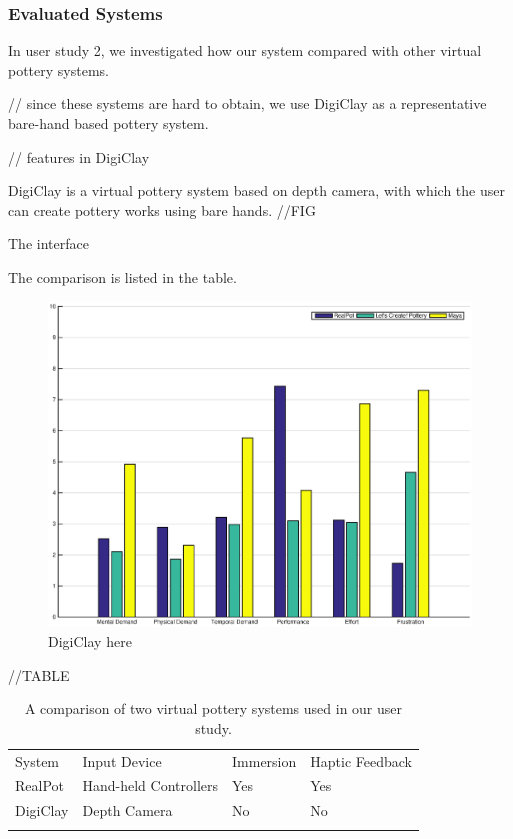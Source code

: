 \subsubsection{Evaluated Systems}

In user study 2, we investigated how our system compared with other virtual pottery systems.

// since these systems are hard to obtain, we use DigiClay as a representative bare-hand based pottery system.

// features in DigiClay

DigiClay is a virtual pottery system based on depth camera, with which the user can create pottery works using bare hands. //FIG

The interface 

The comparison is listed in the table.


\begin{figure}
	\includegraphics[width=\textwidth]{fig14.eps}
	\caption{DigiClay here}
	\label{fig:dc}
\end{figure}

//TABLE

\begin{table}
\caption{A comparison of two virtual pottery systems used in our user study.}
\label{tab:3}       %
\begin{tabular}{llll}
\hline\noalign{\smallskip}
System & Input Device & Immersion & Haptic Feedback \\
\noalign{\smallskip}\hline\noalign{\smallskip}
RealPot & Hand-held Controllers & Yes & Yes \\
DigiClay & Depth Camera & No & No \\
\noalign{\smallskip}\hline
\end{tabular}
\end{table}



